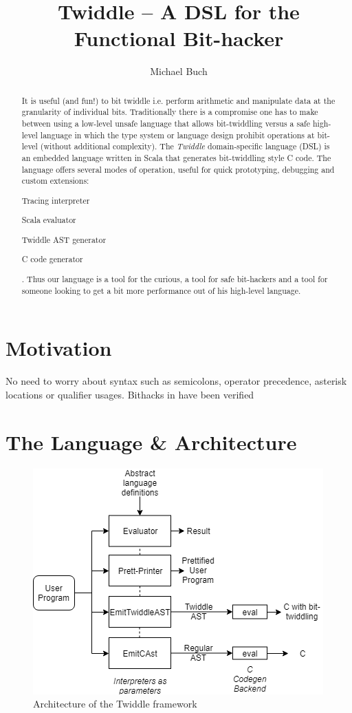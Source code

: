 \documentclass{article}
\title{Twiddle -- A DSL for the Functional Bit-hacker}
\author{Michael Buch}
\begin{document}
\maketitle
\frenchspacing

\begin{abstract}
It is useful (and fun!) to bit twiddle i.e. perform arithmetic and manipulate data at the granularity of individual bits. Traditionally there is a compromise one has to make between using a low-level unsafe language that allows bit-twiddling versus a safe high-level language in which the type system or language design prohibit operations at bit-level (without additional complexity). The \textit{Twiddle} domain-specific language (DSL) is an embedded language written in Scala that generates bit-twiddling style C code. The language offers several modes of operation, useful for quick prototyping, debugging and custom extensions:
\begin{enumerate*}[label=(\arabic*)]
	\item Tracing interpreter
	\item Scala evaluator
	\item Twiddle AST generator
	\item C code generator
\end{enumerate*}.
Thus our language is a tool for the curious, a tool for safe bit-hackers and a tool for someone looking to get a bit more performance out of his high-level language.
\end{abstract}

\section{Motivation}
No need to worry about syntax such as semicolons, operator precedence, asterisk locations or qualifier usages.
Bithacks in \cite{anderson2005bit} have been verified
\section{The Language \& Architecture}
\begin{figure}[t]
	\centering
	\includegraphics[scale=1]{twiddle_arch.png}
	\caption{Architecture of the Twiddle framework}\label{twiddle_arch}
\end{figure}
\end{document}
